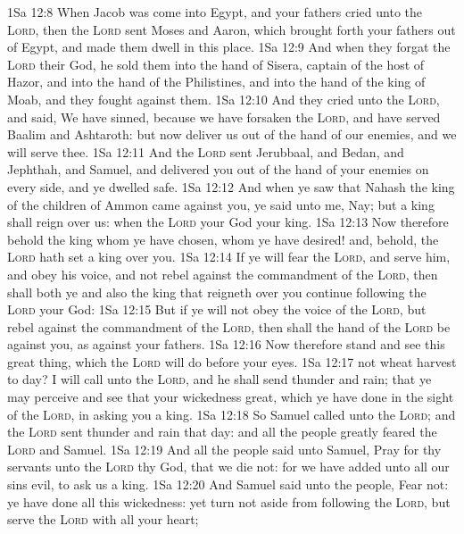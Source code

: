 \vs 1Sa 12:8 When Jacob was come into Egypt, and your fathers cried unto the \textsc{Lord}, then the \textsc{Lord} sent Moses and Aaron, which brought forth your fathers out of Egypt, and made them dwell in this place.
\vs 1Sa 12:9 And when they forgat the \textsc{Lord} their God, he sold them into the hand of Sisera, captain of the host of Hazor, and into the hand of the Philistines, and into the hand of the king of Moab, and they fought against them.
\vs 1Sa 12:10 And they cried unto the \textsc{Lord}, and said, We have sinned, because we have forsaken the \textsc{Lord}, and have served Baalim and Ashtaroth: but now deliver us out of the hand of our enemies, and we will serve thee.
\vs 1Sa 12:11 And the \textsc{Lord} sent Jerubbaal, and Bedan, and Jephthah, and Samuel, and delivered you out of the hand of your enemies on every side, and ye dwelled safe.
\vs 1Sa 12:12 And when ye saw that Nahash the king of the children of Ammon came against you, ye said unto me, Nay; but a king shall reign over us: when the \textsc{Lord} your God  your king.
\vs 1Sa 12:13 Now therefore behold the king whom ye have chosen,  whom ye have desired! and, behold, the \textsc{Lord} hath set a king over you.
\vs 1Sa 12:14 If ye will fear the \textsc{Lord}, and serve him, and obey his voice, and not rebel against the commandment of the \textsc{Lord}, then shall both ye and also the king that reigneth over you continue following the \textsc{Lord} your God:
\vs 1Sa 12:15 But if ye will not obey the voice of the \textsc{Lord}, but rebel against the commandment of the \textsc{Lord}, then shall the hand of the \textsc{Lord} be against you, as  against your fathers.
\vs 1Sa 12:16 Now therefore stand and see this great thing, which the \textsc{Lord} will do before your eyes.
\vs 1Sa 12:17  not wheat harvest to day? I will call unto the \textsc{Lord}, and he shall send thunder and rain; that ye may perceive and see that your wickedness  great, which ye have done in the sight of the \textsc{Lord}, in asking you a king.
\vs 1Sa 12:18 So Samuel called unto the \textsc{Lord}; and the \textsc{Lord} sent thunder and rain that day: and all the people greatly feared the \textsc{Lord} and Samuel.
\vs 1Sa 12:19 And all the people said unto Samuel, Pray for thy servants unto the \textsc{Lord} thy God, that we die not: for we have added unto all our sins  evil, to ask us a king.
\vs 1Sa 12:20 And Samuel said unto the people, Fear not: ye have done all this wickedness: yet turn not aside from following the \textsc{Lord}, but serve the \textsc{Lord} with all your heart;

